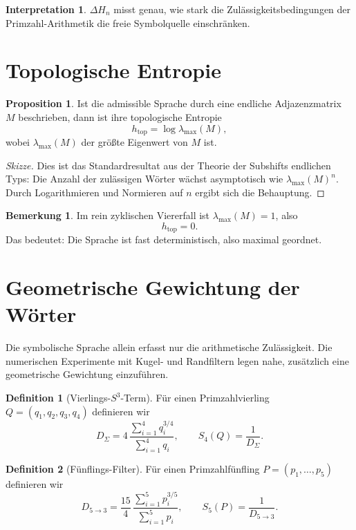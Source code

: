 \documentclass[11pt,a4paper]{article}
\theoremstyle{definition}
\newtheorem{definition}{Definition}[section]
\newtheorem{proposition}{Proposition}[section]
\newtheorem{remark}{Bemerkung}[section]
\newtheorem{interpretation}{Interpretation}[section]
\begin{document}
	\begin{interpretation}
		\(\Delta H_n\) misst genau, wie stark die Zulässigkeitsbedingungen der Primzahl-Arithmetik die freie Symbolquelle einschränken.
	\end{interpretation}
	
	\section{Topologische Entropie}
	
	\begin{proposition}
		Ist die admissible Sprache durch eine endliche Adjazenzmatrix \(M\) beschrieben, dann ist ihre topologische Entropie
		\[
		h_{\mathrm{top}}=\log \lambda_{\max}(M),
		\]
		wobei \(\lambda_{\max}(M)\) der größte Eigenwert von \(M\) ist.
	\end{proposition}
	
	\begin{proof}[Skizze]
		Dies ist das Standardresultat aus der Theorie der Subshifts endlichen Typs: Die Anzahl der zulässigen Wörter wächst asymptotisch wie \(\lambda_{\max}(M)^n\). Durch Logarithmieren und Normieren auf \(n\) ergibt sich die Behauptung.
	\end{proof}
	
	\begin{remark}
		Im rein zyklischen Viererfall ist \(\lambda_{\max}(M)=1\), also
		\[
		h_{\mathrm{top}}=0.
		\]
		Das bedeutet: Die Sprache ist fast deterministisch, also maximal geordnet.
	\end{remark}
	
	\section{Geometrische Gewichtung der Wörter}
	
	Die symbolische Sprache allein erfasst nur die arithmetische Zulässigkeit. Die numerischen Experimente mit Kugel- und Randfiltern legen nahe, zusätzlich eine geometrische Gewichtung einzuführen.
	
	\begin{definition}[Vierlings-\(S^3\)-Term]
		Für einen Primzahlvierling \(Q=(q_1,q_2,q_3,q_4)\) definieren wir
		\[
		D_\Sigma = 4\,\frac{\sum_{i=1}^4 q_i^{3/4}}{\sum_{i=1}^4 q_i},
		\qquad
		S_4(Q)=\frac{1}{D_\Sigma}.
		\]
	\end{definition}
	
	\begin{definition}[Fünflings-Filter]
		Für einen Primzahlfünfling \(P=(p_1,\dots,p_5)\) definieren wir
		\[
		D_{5\to3}=\frac{15}{4}\,\frac{\sum_{i=1}^5 p_i^{3/5}}{\sum_{i=1}^5 p_i},
		\qquad
		S_5(P)=\frac{1}{D_{5\to3}}.
		\]
	\end{definition}
	
\end{document}
